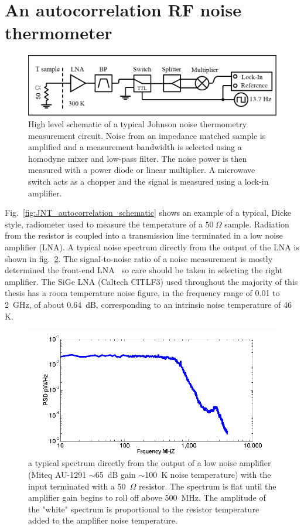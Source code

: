 \section{An autocorrelation RF noise thermometer}
\begin{figure}
\includegraphics[width=130mm]{figures/Johnson_noise_thermometry/Schematic_Autocorrelation.png}
\caption[JNT autocorrelation schematic]{High level schematic of a typical Johnson noise thermometry measurement circuit. Noise from an impedance matched sample is amplified and a measurement bandwidth is selected using a homodyne mixer and low-pass filter. The noise power is then measured with a power diode or linear multiplier. A microwave switch acts as a chopper and the signal is measured using a lock-in amplifier.}
\label{fig:schematic_autocorrelation}
\end{figure}

Fig.~\ref{fig:JNT_autocorrelation_schematic} shows an example of a typical, Dicke style, radiometer used to measure the temperature of a $50~\Omega$ sample. Radiation from the resistor is coupled into a transmission line terminated in a low noise amplifier (LNA). A typical noise spectrum directly from the output of the LNA is shown in fig.~\ref{fig:Miteq_spec}. The signal-to-noise ratio of a noise measurement is mostly determined the front-end LNA~\cite{pozar_microwave_2011} so care should be taken in selecting the right amplifier. The SiGe LNA (Caltech CITLF3) used throughout the majority of this thesis has a room temperature noise figure, in the frequency range of 0.01 to 2~GHz, of about 0.64~dB, corresponding to an intrinsic noise temperature of 46 K.
\begin{figure}
\includegraphics[width=\textwidth]{figures/Johnson_noise_thermometry/Miteq_spec.png}
\caption{a typical spectrum directly from the output of a low noise amplifier (Miteq AU-1291 $\sim$65~dB gain $\sim$100~K noise temperature) with the input terminated with a 50~$\Omega$ resistor. The spectrum is flat until the amplifier gain begins to roll off above 500~MHz. The amplitude of the "white" spectrum is proportional to the resistor temperature added to the amplifier noise temperature.}
\label{fig:Miteq_spec}
\end{figure}


